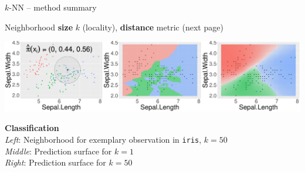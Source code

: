 \begin{frame} {$k$-NN -- method summary}

  \medskip
   Neighborhood \textbf{size} $k$ (locality), 
  \textbf{distance} metric (next page)

  \vspace{5px}

  \begin{minipage}{0.7\textwidth}
    \includegraphics[width=\textwidth]{figure/knn-neighborhood.pdf}
  \end{minipage}%
  \hfill
  \begin{minipage}{0.25\textwidth}
    \tiny
    \raggedright
    \textbf{Classification} \\
    \textit{Left}: Neighborhood for exemplary observation in \texttt{iris}, 
    $k = 50$ \\
    \textit{Middle}: Prediction surface for $k = 1$\\
    \textit{Right}: Prediction surface for $k = 50$
  \end{minipage}


\end{frame}
